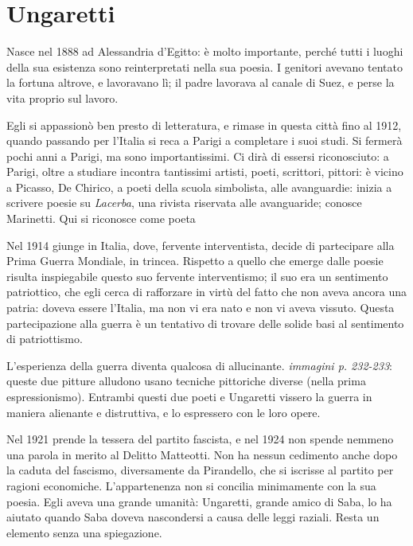 \chapter{Ungaretti}


Nasce nel 1888 ad Alessandria d'Egitto: è molto importante, perché tutti i luoghi della sua esistenza sono reinterpretati nella sua poesia.
I genitori avevano tentato la fortuna altrove, e lavoravano lì; il padre lavorava al canale di Suez, e perse la vita proprio sul lavoro.

Egli si appassionò ben presto di letteratura, e rimase in questa città fino al 1912, quando passando per l'Italia si reca a Parigi a completare i suoi studi.
Si fermerà pochi anni a Parigi, ma sono importantissimi. Ci dirà di essersi riconosciuto: a Parigi, oltre a studiare incontra tantissimi artisti, poeti, scrittori, pittori: è vicino a Picasso, De Chirico, a poeti della scuola simbolista, alle avanguardie: inizia a scrivere poesie su \textit{Lacerba}, una rivista riservata alle avanguaride; conosce Marinetti.
Qui si riconosce come poeta

Nel 1914 giunge in Italia, dove, fervente interventista, decide di partecipare alla Prima Guerra Mondiale, in trincea.
Rispetto a quello che emerge dalle poesie risulta inspiegabile questo suo fervente interventismo; il suo era un sentimento patriottico, che egli cerca di rafforzare in virtù del fatto che non aveva ancora una patria: doveva essere l'Italia, ma non vi era nato e non vi aveva vissuto.
Questa partecipazione alla guerra è un tentativo di trovare delle solide basi al sentimento di patriottismo.

L'esperienza della guerra diventa qualcosa di allucinante.
\emph{immagini p. 232-233}: queste due pitture alludono usano tecniche pittoriche diverse (nella prima espressionismo). Entrambi questi due poeti e Ungaretti vissero la guerra in maniera alienante e distruttiva, e lo espressero con le loro opere.

Nel 1921 prende la tessera del partito fascista, e nel 1924 non spende nemmeno una parola in merito al Delitto Matteotti.
Non ha nessun cedimento anche dopo la caduta del fascismo, diversamente da Pirandello, che si iscrisse al partito per ragioni economiche.
L'appartenenza non si concilia minimamente con la sua poesia. Egli aveva una grande umanità: Ungaretti, grande amico di Saba, lo ha aiutato quando Saba doveva nascondersi a causa delle leggi raziali. Resta un elemento senza una spiegazione.

